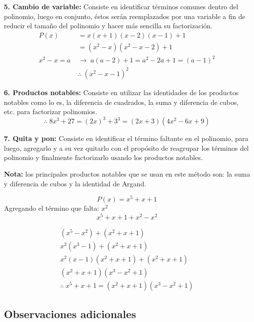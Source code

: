 \documentclass[11pt,a4paper]{article}
\newcommand{\hl}[1]{\textcolor{resaltado}{#1}}
\begin{document}
\bigskip
\textbf{5. Cambio de variable:} Consiste en identificar términos comunes dentro del
polinomio, luego en conjunto, éstos serán reemplazados por una variable a fin de reducir
el tamaño del polinomio y hacer más sencilla su factorización.
\begin{align*}
P(x) &= x(x+1)(x-2)(x-1) + 1\\
     &= (x^2 - x)(x^2 - x - 2) + 1\\
x^2 - x = a \;&\rightarrow\; a(a-2) + 1 = a^2 - 2a + 1 = (a-1)^2\\
&\therefore\; (x^2 - x - 1)^2
\end{align*}


\textbf{6. Productos notables:} Consiste en utilizar las identidades de los productos
notables como lo es, \hl{la diferencia de cuadrados, la suma y diferencia de cubos, etc.}
para factorizar polinomios.
\[\therefore\; 8x^3 + 27 = (2x)^3 + 3^3 = (2x+3)(4x^2 - 6x + 9)\]

\textbf{7. Quita y pon:} Consiste en identificar el término faltante en el polinomio, para
luego, agregarlo y a su vez quitarlo con el propósito de reagrupar los términos del
polinomio y finalmente factorizarlo usando los productos notables.

\textbf{Nota:} los principales productos notables que se usan en este método son:
\hl{la suma y diferencia de cubos y la identidad de Argand.}

\begin{minipage}[t]{0.436\textwidth}
\[P(x) = x^5 + x + 1\]
Agregando el término que falta: $x^2$
\[x^5 + x + 1 + x^2 - x^2\]
\end{minipage}\hfill
\begin{minipage}[t]{0.533\textwidth}
\begin{gather*}
(x^5 - x^2) + (x^2 + x + 1)\\
x^2(x^3 - 1) + (x^2 + x + 1)\\
x^2(x-1)(x^2+x+1) + (x^2+x+1)\\
(x^2+x+1)(x^3 - x^2 + 1)\\
\therefore\; x^5 + x + 1 = (x^2+x+1)(x^3 - x^2 + 1)
\end{gather*}
\end{minipage}

\subsection*{Observaciones adicionales}
\end{document}
